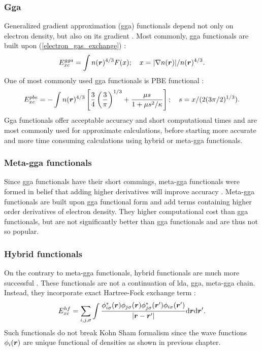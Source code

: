 \documentclass[openany, longbibliography,slovene,a4paper,12pt]{article}
\def\vec#1{\mbox{\boldmath$#1$}}
\newcommand{\dif}{\mathrm{d}}
\begin{document}
\subsubsection{Gga}
Generalized gradient approximation (gga) functionals
depend not only on electron density, but also on its gradient
\cite{challenges_den_fun_theor}. Most commonly, gga functionals are built upon (\ref{electron_gas_exchange}) \cite{challenges_den_fun_theor}:
\begin{equation}
  E_{xc}^{gga}=\int n(\vec r)^{4/3}F(x);\quad x=|\nabla n(\vec r)|/n(\vec r)^{4/3}.
\end{equation}
One of most commonly used gga functionals is PBE functional
 \cite{challenges_den_fun_theor}:
\begin{equation}
  E_{xc}^{pbe}=-\int  n(\vec r)^{4/3}\left[ \frac{3}{4}\left(\frac{3}{\pi}\right)^{1/3} + \frac{\mu s}{1+ \mu s^2/\kappa} \right]; \quad s=x/(2(3\pi/2)^{1/3}).
\end{equation}
Gga functionals offer acceptable accuracy and short computational times and are
most commonly used for approximate calculations, before starting more accurate
and more time consuming calculations using hybrid or meta-gga functionals.

\subsubsection{Meta-gga functionals}
Since gga functionals have their short commings, meta-gga functionals were formed
in belief that adding higher derivatives will improve accuracy
\cite{challenges_den_fun_theor}. Meta-gga functionals are built upon gga
functional form and add terms containing higher order derivatives of electron
density. They higher computational cost than gga functionals, but are not significantly better than gga
functionals and are thus not so popular.


\subsubsection{Hybrid functionals}
On the contrary to meta-gga functionals, hybrid functionals are much more
successful \cite{challenges_den_fun_theor}. These functionals are not a
continuation of lda, gga, meta-gga chain. Instead, they incorporate exact
Hartree-Fock exchange term \cite{challenges_den_fun_theor}:
\begin{equation}
  E^{hf}_{xc}=\sum_ {i,j,\sigma}\int\frac{\phi^*_{i\sigma}(\vec r) \phi_{j\sigma}(\vec r) \phi^*_{j\sigma}(\vec r') \phi_{i\sigma}(\vec r')}{|\vec r - \vec r'|}\dif \vec r \dif \vec r'.
\end{equation}
Such functionals do not break Kohn Sham formalism since the wave functions
$\phi_i(\vec r)$ are unique functional of densities as shown in previous
chapter.
\end{document}
